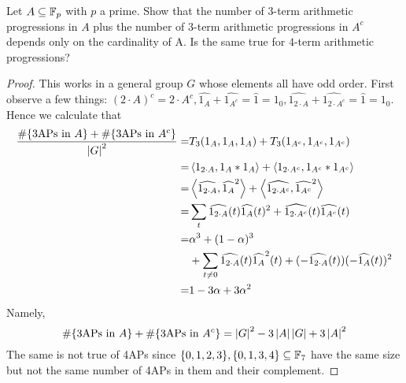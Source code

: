 \documentclass{article}
\begin{document}
\begin{problem}
  Let $A \subseteq \mathbb F_p$ with $p$ a prime. Show that the number of $3$-term arithmetic progressions in $A$ plus the number of $3$-term arithmetic progressions in $A^c$ depends only on the cardinality of A. Is the same true for $4$-term arithmetic progressions?
\end{problem}
\begin{proof}
  This works in a general group $G$ whose elements all have odd order. First observe a few things: $(2 \cdot A)^c = 2 \cdot A^c, \widehat{1_A} + \widehat{1_{A^c}} = \hat 1 = 1_0, \widehat{1_{2 \cdot A}} + \widehat{1_{2 \cdot A^c}} = \hat 1 = 1_0$. Hence we calculate that
  \begin{align*}
    \frac{\#\{\text{3APs in }A\} + \#\{\text{3APs in }A^c\}}{\left\lvert G\right\rvert^2}
    = & T_3(1_A, 1_A, 1_A) + T_3(1_{A^c}, 1_{A^c}, 1_{A^c}) \\
    = & \left\langle 1_{2 \cdot A}, 1_A \ast 1_A\right\rangle + \left\langle 1_{2 \cdot A^c}, 1_{A^c} \ast 1_{A^c}\right\rangle \\
    = & \left\langle \widehat{1_{2 \cdot A}}, \widehat{1_A}^2\right\rangle + \left\langle \widehat{1_{2 \cdot A^c}}, \widehat{1_{A^c}}^2\right\rangle \\
    = & \sum_t \widehat{1_{2 \cdot A}}(t)\widehat{1_A}(t)^2 + \widehat{1_{2 \cdot A^c}}(t)\widehat{1_{A^c}}(t) \\
    = & \alpha^3 + (1 - \alpha)^3 \\
    & + \sum_{t \ne 0} \widehat{1_{2 \cdot A}}(t)\widehat{1_A}^2(t) + (-\widehat{1_{2 \cdot A}}(t))(-\widehat{1_A}(t))^2 \\
    = & 1 - 3\alpha + 3\alpha^2
  \end{align*}
  Namely,
  $$\#\{\text{3APs in }A\} + \#\{\text{3APs in }A^c\} = \left\lvert G\right\rvert^2 - 3\left\lvert A\right\rvert\left\lvert G\right\rvert + 3\left\lvert A\right\rvert^2$$
  The same is not true of 4APs since $\{0, 1, 2, 3\}, \{0, 1, 3, 4\} \subseteq \mathbb F_7$ have the same size but not the same number of 4APs in them and their complement.
\end{proof}
\end{document}
